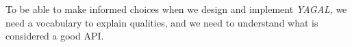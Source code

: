 \label{cha:designPrinciples}
To be able to make informed choices when we design and implement \textit{YAGAL}, we need a vocabulary to explain qualities, and we need to understand what is considered a good API.